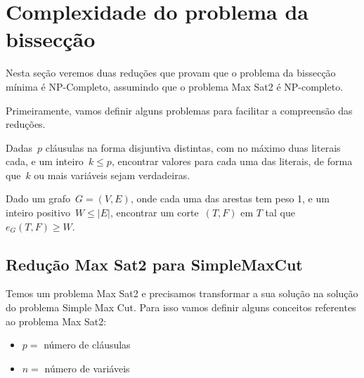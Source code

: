 \section {Complexidade do problema da bissecção}
	Nesta seção veremos duas reduções que provam que o problema 
	da bissecção mínima é NP-Completo, assumindo
	que o problema Max Sat2 é NP-completo.

	Primeiramente, vamos definir alguns problemas para facilitar
	a compreensão das reduções.

	\medskip

	\begin{prob}
		Dadas~$p$ cláusulas na forma disjuntiva distintas, com no máximo
		duas literais cada, e um inteiro~$k\le p$,
		encontrar valores para cada uma das literais, de forma
		que~$k$ ou mais variáveis sejam verdadeiras.

	\end{prob}

	\medskip

	\begin{prob}
		Dado um grafo~${G=(V,E)}$, onde cada uma das arestas tem 
		peso 1, e um inteiro positivo~${W\le|E|}$, encontrar um
		corte~$(T,F)$ em $T$ tal 
		que~${e_G(T,F)\ge W}$.
		
	\end{prob}

	

		

	\bigskip
	\bigskip
	\bigskip

	\subsection{Redução Max Sat2 para SimpleMaxCut}

		Temos um problema Max Sat2 e precisamos transformar
		a sua solução na solução do problema Simple Max Cut.
		Para isso vamos definir alguns conceitos referentes
		ao problema Max Sat2:
		\begin{itemize}
			\item $p = $ número de cláusulas
			\item $n = $ número de variáveis
		\end{itemize}

